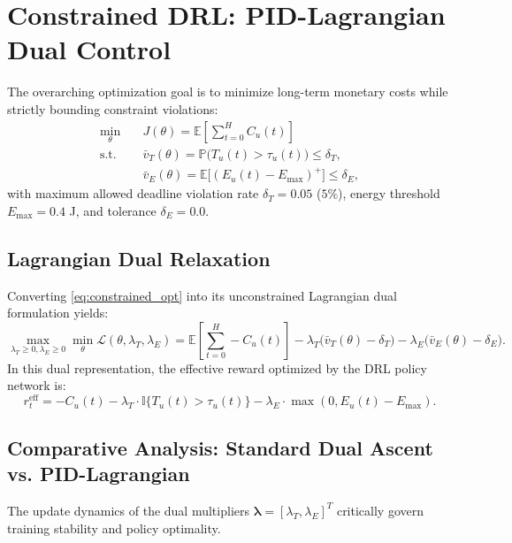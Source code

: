 \documentclass[12pt,a4paper]{article}
\begin{document}
\section{Constrained DRL: PID-Lagrangian Dual Control}
\label{sec:pid_lagrangian}

The overarching optimization goal is to minimize long-term monetary costs while strictly bounding constraint violations:
\begin{equation}
\begin{aligned}
\min_{\theta} \quad & J(\theta) = \mathbb{E}\left[ \sum_{t=0}^H C_u(t) \right] \\
\text{s.t.} \quad & \bar{v}_T(\theta) = \mathbb{P}\big(T_u(t) > \tau_u(t)\big) \le \delta_T, \\
& \bar{v}_E(\theta) = \mathbb{E}\big[(E_u(t) - E_{\max})^+\big] \le \delta_E,
\end{aligned}
\label{eq:constrained_opt}
\end{equation}
with maximum allowed deadline violation rate $\delta_T = 0.05$ ($5\%$), energy threshold $E_{\max} = 0.4$ J, and tolerance $\delta_E = 0.0$.

\subsection{Lagrangian Dual Relaxation}
Converting \eqref{eq:constrained_opt} into its unconstrained Lagrangian dual formulation yields:
\begin{equation}
\max_{\lambda_T \ge 0, \lambda_E \ge 0} \min_{\theta} \mathcal{L}(\theta, \lambda_T, \lambda_E) = \mathbb{E}\left[ \sum_{t=0}^H -C_u(t) \right] - \lambda_T \big( \bar{v}_T(\theta) - \delta_T \big) - \lambda_E \big( \bar{v}_E(\theta) - \delta_E \big).
\label{eq:lagrangian_formulation}
\end{equation}
In this dual representation, the effective reward optimized by the DRL policy network is:
\begin{equation}
r_t^{\mathrm{eff}} = -C_u(t) - \lambda_T \cdot \mathbb{I}\{T_u(t) > \tau_u(t)\} - \lambda_E \cdot \max(0, E_u(t) - E_{\max}).
\label{eq:effective_reward}
\end{equation}

\subsection{Comparative Analysis: Standard Dual Ascent vs. PID-Lagrangian}
The update dynamics of the dual multipliers $\boldsymbol{\lambda} = [\lambda_T, \lambda_E]^T$ critically govern training stability and policy optimality.
\end{document}
